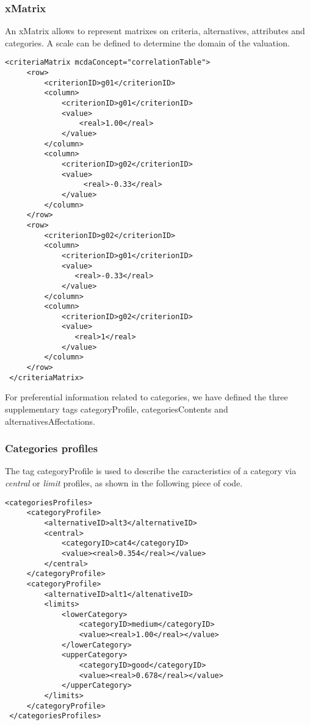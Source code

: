 \documentclass[a4paper,oneside,10 pt]{article}
\newcommand{\code}{\asciifamily}
\begin{document}
\subsubsection{{\code x}Matrix}

An {\code x}Matrix allows to represent matrixes on criteria, alternatives, attributes and categories. A {\code scale} can be defined to determine the domain of the valuation. 

{\code
\begin{lstlisting}[style=prototype]
 <criteriaMatrix mcdaConcept="correlationTable">
     <row>
         <criterionID>g01</criterionID>
         <column>
             <criterionID>g01</criterionID>
             <value>
                 <real>1.00</real>
             </value>
         </column>
         <column>
             <criterionID>g02</criterionID>
             <value>
                  <real>-0.33</real>
             </value>
         </column>
     </row>
     <row>
         <criterionID>g02</criterionID>
         <column>
             <criterionID>g01</criterionID>
             <value>
                <real>-0.33</real>
             </value>
         </column>
         <column>
             <criterionID>g02</criterionID>
             <value>
                <real>1</real>
             </value>
         </column>
     </row>
 </criteriaMatrix>
\end{lstlisting}
}

For preferential information related to categories, we have defined the three supplementary tags {\code categoryProfile}, {\code categoriesContents} and {\code alternativesAffectations}.

\subsubsection{Categories profiles}

The tag {\code categoryProfile} is used to describe the caracteristics of a category via \textit{central} or \textit{limit} profiles, as shown in the following piece of code. 
{\code
\begin{lstlisting}[style=prototype]
 <categoriesProfiles>
	 <categoryProfile>
		 <alternativeID>alt3</alternativeID>
		 <central>
			 <categoryID>cat4</categoryID>
			 <value><real>0.354</real></value>
		 </central>
	 </categoryProfile>
	 <categoryProfile>
		 <alternativeID>alt1</altenativeID>
		 <limits>
			 <lowerCategory>
				 <categoryID>medium</categoryID>
				 <value><real>1.00</real></value>
			 </lowerCategory>
			 <upperCategory>
				 <categoryID>good</categoryID>
				 <value><real>0.678</real></value>
			 </upperCategory>
		 </limits>
	 </categoryProfile>
 </categoriesProfiles>
\end{lstlisting}
}
\end{document}
